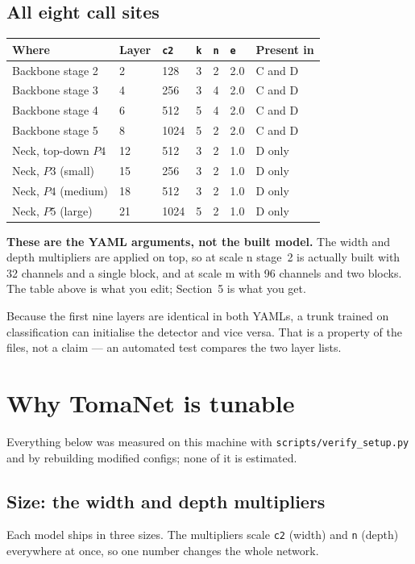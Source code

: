 \documentclass[11pt,a4paper]{article}
\begin{document}
\subsection*{All eight call sites}
\begin{center}
\small
\begin{tabular}{@{}lllllll@{}}
\toprule
\textbf{Where} & \textbf{Layer} & \texttt{c2} & \texttt{k} & \texttt{n} & \texttt{e} & \textbf{Present in} \\
\midrule
Backbone stage 2 & 2  & 128  & 3 & 2 & 2.0 & C and D \\
Backbone stage 3 & 4  & 256  & 3 & 4 & 2.0 & C and D \\
Backbone stage 4 & 6  & 512  & 5 & 4 & 2.0 & C and D \\
Backbone stage 5 & 8  & 1024 & 5 & 2 & 2.0 & C and D \\
\midrule
Neck, top-down $P4$ & 12 & 512  & 3 & 2 & 1.0 & D only \\
Neck, $P3$ (small)  & 15 & 256  & 3 & 2 & 1.0 & D only \\
Neck, $P4$ (medium) & 18 & 512  & 3 & 2 & 1.0 & D only \\
Neck, $P5$ (large)  & 21 & 1024 & 5 & 2 & 1.0 & D only \\
\bottomrule
\end{tabular}
\end{center}

\vspace{4pt}
\noindent \textbf{These are the YAML arguments, not the built model.} The width and depth
multipliers are applied on top, so at scale n stage~2 is actually built with 32 channels
and a single block, and at scale m with 96 channels and two blocks. The table above is
what you edit; Section~5 is what you get.

\vspace{2pt}
\noindent Because the first nine layers are identical in both YAMLs, a trunk trained on
classification can initialise the detector and vice versa. That is a property of the
files, not a claim --- an automated test compares the two layer lists.

\section{Why TomaNet is tunable}
Everything below was measured on this machine with
\texttt{scripts/verify\_setup.py} and by rebuilding modified configs; none of it is
estimated.

\subsection*{Size: the width and depth multipliers}
Each model ships in three sizes. The multipliers scale \texttt{c2} (width) and \texttt{n}
(depth) everywhere at once, so one number changes the whole network.
\end{document}
